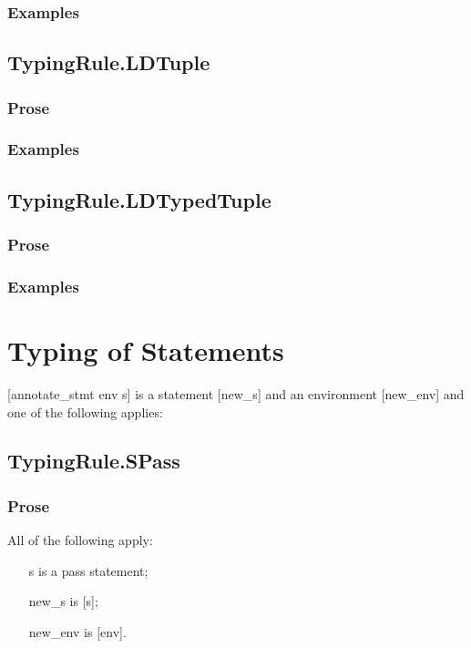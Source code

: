 \documentclass{book}
\begin{document}
    \subsubsection{Examples}

\subsection{TypingRule.LDTuple}

    \subsubsection{Prose}

    \subsubsection{Examples}

\subsection{TypingRule.LDTypedTuple}

    \subsubsection{Prose}

    \subsubsection{Examples}

\section{
Typing of Statements
}
[annotate\_stmt env s] is a statement [new\_s] and an environment [new\_env] and
one of the following applies:

\subsection{TypingRule.SPass}

    \subsubsection{Prose}
    All of the following apply:
   \begin{itemize}
   \item [s] is a pass statement;
   \item [new\_s] is [s];
   \item [new\_env] is [env].
   \end{itemize}
\end{document}
